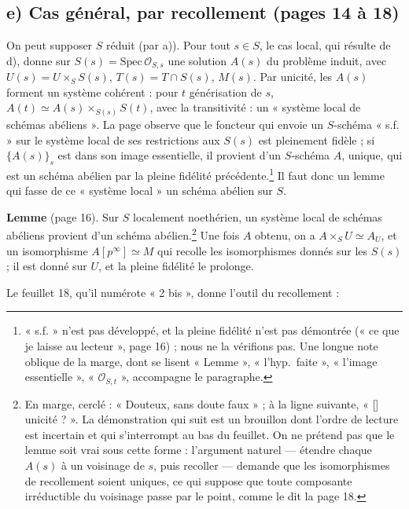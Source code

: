 \documentclass[11pt,a4paper]{article}
\begin{document}
\subsection*{e) Cas général, par recollement (pages 14 à 18)}

On peut supposer $S$ réduit (par a)). Pour tout $s \in S$, le cas local, qui
résulte de d), donne
sur $S(s) = \mathrm{Spec}\,\mathcal{O}_{S,s}$ une solution $A(s)$ du problème
induit, avec $U(s) = U \times_S S(s)$, $T(s) = T \cap S(s)$, $M(s)$. Par
unicité, les $A(s)$ forment un système cohérent : pour $t$ générisation de
$s$, $A(t) \simeq A(s) \times_{S(s)} S(t)$, avec la transitivité : un
« système local de schémas abéliens ». La page observe que le foncteur qui
envoie un $S$-schéma « s.f. » sur le système local de ses restrictions aux
$S(s)$ est pleinement fidèle ; si $\{A(s)\}_s$ est dans son image
essentielle, il provient d'un $S$-schéma $A$, unique, qui est un schéma
abélien par la pleine fidélité précédente.\footnote{« s.f. » n'est pas
développé, et la pleine fidélité n'est pas démontrée (« ce que je laisse au
lecteur », page 16) ; nous ne la vérifions pas. Une longue note oblique de la
marge, dont se lisent « Lemme », « l'hyp.\ faite », « l'image essentielle »,
« $\mathcal{O}_{S,t}$ », accompagne le paragraphe.} Il faut donc un
lemme qui fasse de ce « système local » un schéma abélien sur $S$.

\textbf{Lemme} (page 16). Sur $S$ localement noethérien, un système local de
schémas abéliens provient d'un schéma abélien.\footnote{En marge, cerclé :
« Douteux, sans doute faux » ; à la ligne suivante, « [\;] unicité ? ». La démonstration qui
suit est un brouillon dont l'ordre de lecture est incertain et qui
s'interrompt au bas du feuillet. On ne prétend pas que le lemme soit vrai
sous cette forme : l'argument naturel --- étendre chaque $A(s)$ à un voisinage
de $s$, puis recoller --- demande que les isomorphismes de recollement soient
uniques, ce qui suppose que toute composante irréductible du voisinage passe
par le point, comme le dit la page 18.} Une fois $A$ obtenu, on a
$A \times_S U \simeq A_U$, et un isomorphisme $A[p^\infty] \simeq M$ qui
recolle les isomorphismes donnés sur les $S(s)$ ; il est donné sur $U$, et la
pleine fidélité le prolonge.

Le feuillet 18, qu'il numérote « 2 bis », donne l'outil du recollement :
\end{document}
